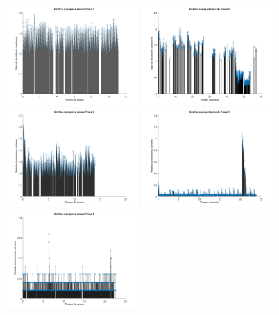 \begin{enumerate}
  \begin{figure}[H]
    \includegraphics[width=0.45\textwidth]{img/traza1_PE.png}
    \hfill
    \includegraphics[width=0.45\textwidth]{img/traza2_PE.png}
    \vfill
    \includegraphics[width=0.45\textwidth]{img/traza3_PE.png}
    \hfill
    \includegraphics[width=0.45\textwidth]{img/traza4_PE.png}
    \vfill
    \includegraphics[width=0.45\textwidth]{img/traza5_PE.png}

\end{figure}
\end{enumerate}
